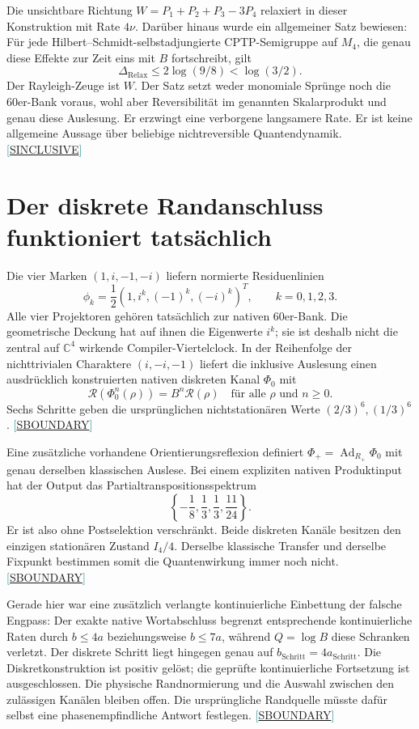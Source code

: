 \documentclass[11pt,a4paper,oneside,parskip=half,headings=normal,numbers=noenddot,bibliography=totoc]{scrreprt}
\newcommand{\C}{\mathbb C}
\newcommand{\src}[1]{\textcolor{teal}{\small[\hyperref[s:#1]{S#1}]}}
\begin{document}
Die unsichtbare Richtung $W=P_1+P_2+P_3-3P_4$ relaxiert in dieser Konstruktion mit Rate $4\nu$. Darüber hinaus wurde ein allgemeiner Satz bewiesen: Für jede Hilbert--Schmidt-selbstadjungierte CPTP-Semigruppe auf $M_4$, die genau diese Effekte zur Zeit eins mit $B$ fortschreibt, gilt
\[
 \Delta_{\mathrm{Relax}}\le2\log(9/8)<\log(3/2).
\]
Der Rayleigh-Zeuge ist $W$. Der Satz setzt weder monomiale Sprünge noch die 60er-Bank voraus, wohl aber Reversibilität im genannten Skalarprodukt und genau diese Auslesung. Er erzwingt eine verborgene langsamere Rate. Er ist keine allgemeine Aussage über beliebige nichtreversible Quantendynamik. \src{INCLUSIVE}

\section{Der diskrete Randanschluss funktioniert tatsächlich}
Die vier Marken $(1,i,-1,-i)$ liefern normierte Residuenlinien
\[
 \phi_k=\frac12(1,i^k,(-1)^k,(-i)^k)^T,\qquad k=0,1,2,3.
\]
Alle vier Projektoren gehören tatsächlich zur nativen 60er-Bank. Die geometrische Deckung hat auf ihnen die Eigenwerte $i^k$; sie ist deshalb nicht die zentral auf $\C^4$ wirkende Compiler-Viertelclock. In der Reihenfolge der nichttrivialen Charaktere $(i,-i,-1)$ liefert die inklusive Auslesung einen ausdrücklich konstruierten nativen diskreten Kanal $\Phi_0$ mit
\[
 \mathcal R(\Phi_0^n(\rho))=B^n\mathcal R(\rho)
 \quad\text{für alle }\rho\text{ und }n\ge0.
\]
Sechs Schritte geben die ursprünglichen nichtstationären Werte $(2/3)^6,(1/3)^6$. \src{BOUNDARY}

Eine zusätzliche vorhandene Orientierungsreflexion definiert $\Phi_+=\operatorname{Ad}_{R_+}\Phi_0$ mit genau derselben klassischen Auslese. Bei einem expliziten nativen Produktinput hat der Output das Partialtranspositionsspektrum
\[
 \left\{-\frac18,\frac13,\frac13,\frac{11}{24}\right\}.
\]
Er ist also ohne Postselektion verschränkt. Beide diskreten Kanäle besitzen den einzigen stationären Zustand $I_4/4$. Derselbe klassische Transfer und derselbe Fixpunkt bestimmen somit die Quantenwirkung immer noch nicht. \src{BOUNDARY}

Gerade hier war eine zusätzlich verlangte kontinuierliche Einbettung der falsche Engpass: Der exakte native Wortabschluss begrenzt entsprechende kontinuierliche Raten durch $b\le4a$ beziehungsweise $b\le7a$, während $Q=\log B$ diese Schranken verletzt. Der diskrete Schritt liegt hingegen genau auf $b_{\mathrm{Schritt}}=4a_{\mathrm{Schritt}}$. Die Diskretkonstruktion ist positiv gelöst; die geprüfte kontinuierliche Fortsetzung ist ausgeschlossen. Die physische Randnormierung und die Auswahl zwischen den zulässigen Kanälen bleiben offen. Die ursprüngliche Randquelle müsste dafür selbst eine phasenempfindliche Antwort festlegen. \src{BOUNDARY}
\end{document}
